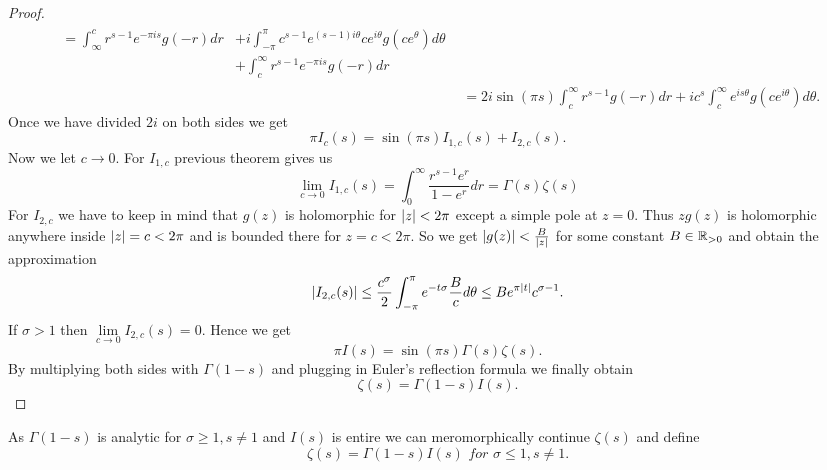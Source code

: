 \begin{proof}
\begin{equation*}
\begin{aligned}
\begin{aligned}
		= \int _\infty ^c r^{s - 1} e^{-\pi i s} g(-r) dr
		&+ i \int _{-\pi} ^{\pi} c^{s - 1} e^{(s - 1) i \theta} c e^{i \theta} g(c e^\theta) d\theta \\ 
		&+ \int _{c} ^\infty r^{s - 1} e^{-\pi i s} g(-r) dr
	\end{aligned} \\
	&= 2 i \sin(\pi s) \int _c ^\infty r^{s - 1} g(-r) dr + i c^s \int _c ^\infty e^{i s \theta} g(c e^{i \theta}) d\theta.
\end{aligned}
\end{equation*}
	Once we have divided $2i$ on both sides we get
\begin{equation*}
	\pi I_c(s) = \sin(\pi s)I_{1, c}(s) + I_{2, c}(s).
\end{equation*}
	Now we let $c \to 0$. For $I_{1, c}$ previous theorem gives us
\begin{equation*}
	\lim\limits _{c \to 0} I_{1, c}(s) = \int _0 ^\infty \frac{r^{s - 1} e^r}{1 - e^r} dr = \Gamma(s)\zeta(s)
\end{equation*}
	For $I_{2, c}$ we have to keep in mind that $g(z)$ is holomorphic for $\left|z\right| < 2 \pi$ except a simple pole at $z = 0$. Thus $z g(z)$ is holomorphic anywhere inside $\left|z\right| = c < 2 \pi$ and is bounded there for $z = c < 2 \pi$. So we get $\left|g(z)\right| < \frac{B}{\left|z\right|}$ for some constant $B \in \mathbb{R}_{> 0}$ and obtain the approximation
\begin{equation*}
	\left|I_{2, c}(s)\right| \leq \frac{c^\sigma}{2} \int _{-\pi} ^{\pi} e^{-t \sigma} \frac{B}{c} d\theta \leq B e^{\pi \left|t\right|} c^{\sigma - 1}.
\end{equation*}
	If $\sigma > 1$ then $\lim\limits _{c \to 0} I_{2, c}(s) = 0$. Hence we get
\begin{equation*}
	\pi I(s) = \sin(\pi s) \Gamma(s)\zeta(s).
\end{equation*}
	By multiplying both sides with $\Gamma(1 - s)$ and plugging in Euler's reflection formula we finally obtain
\begin{equation*}
	\zeta(s) = \Gamma(1 - s) I(s).
\end{equation*}
\end{proof}


\begin{definition}
	As $\Gamma(1 - s)$ is analytic for $\sigma \geq 1, s \neq 1$ and $I(s)$ is entire we can meromorphically continue $\zeta(s)$ and define 
\begin{equation*}
	\zeta(s) = \Gamma(1 - s) I(s) \textit{ for } \sigma \leq 1, s \neq 1.
\end{equation*}
\end{definition}


